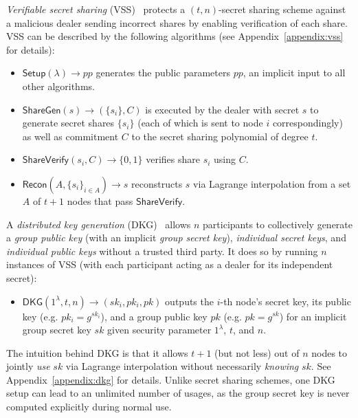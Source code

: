 \begin{definition}
\textit{Verifiable secret sharing} (VSS)~\cite{feldman1987practical, pedersen1991non} protects a $(t, n)$-secret sharing scheme against a malicious dealer sending incorrect shares by enabling verification of each share. VSS can be described by the following algorithms (see Appendix~\ref{appendix:vss} for details):
\begin{itemize}
    \item $\mathsf{Setup}(\lambda) \rightarrow pp$ generates the public parameters $pp$, an implicit input to all other algorithms.
    \item $\mathsf{ShareGen}(s) \rightarrow (\{s_i\}, C)$ is executed by the dealer with secret $s$ to generate secret shares $\{s_i\}$ (each of which is sent to node $i$ correspondingly) as well as commitment $C$ to the secret sharing polynomial of degree $t$.
    \item $\mathsf{ShareVerify}(s_i, C) \rightarrow \{0, 1\}$ verifies share $s_i$ using $C$.
    \item $\mathsf{Recon}(A, \{s_i\}_{i \in A}) \rightarrow s$ reconstructs $s$ via Lagrange interpolation from a set $A$ of $t + 1$ nodes that pass $\mathsf{ShareVerify}$.
\end{itemize}

\end{definition}

\begin{definition}
\label{def:dkg}
A \textit{distributed key generation} (DKG)~\cite{pedersen1991threshold,gennaro1999secure} allows $n$ participants to collectively generate a \textit{group public key} (with an implicit \textit{group secret key}), \textit{individual secret keys}, and \textit{individual public keys} without a trusted third party. It does so by running $n$ instances of VSS (with each participant acting as a dealer for its independent secret):
\begin{itemize}
    \item $\mathsf{DKG}(1^\lambda, t, n) \rightarrow (sk_i, pk_i, pk)$ outputs the $i$-th node's secret key, its public key (e.g. $pk_i = g^{sk_i}$), and a group public key $pk$ (e.g. $pk = g^{sk}$) for an implicit group secret key $sk$ given security parameter $1^\lambda$, $t$, and $n$.
\end{itemize}
The intuition behind DKG is that it allows $t + 1$ (but not less) out of $n$ nodes to jointly \textit{use} $sk$ via Lagrange interpolation without necessarily \textit{knowing} $sk$. See Appendix~\ref{appendix:dkg} for details.
Unlike secret sharing schemes, one DKG setup can lead to an unlimited number of usages, as the group secret key is never computed explicitly during normal use.
\end{definition}

